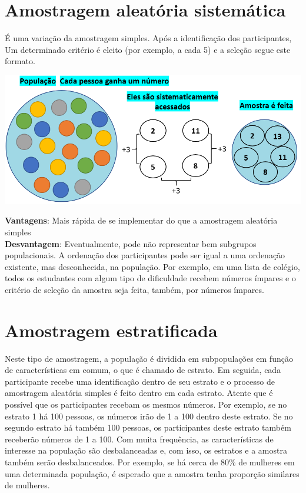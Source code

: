 \documentclass[
]{book}
\begin{document}
\hypertarget{amostragem-aleatuxf3ria-sistemuxe1tica}{%
\section{Amostragem aleatória
sistemática}\label{amostragem-aleatuxf3ria-sistemuxe1tica}}

É uma variação da amostragem simples. Após a identificação dos
participantes, Um determinado critério é eleito (por exemplo, a cada 5)
e a seleção segue este formato.

\includegraphics{./img/cap_a_sistematica.png}

\textbf{Vantagens}: Mais rápida de se implementar do que a amostragem
aleatória simples\\
\textbf{Desvantagem}: Eventualmente, pode não representar bem subgrupos
populacionais. A ordenação dos participantes pode ser igual a uma
ordenação existente, mas desconhecida, na população. Por exemplo, em uma
lista de colégio, todos os estudantes com algum tipo de dificuldade
recebem números ímpares e o critério de seleção da amostra seja feita,
também, por números ímpares.

\hypertarget{amostragem-estratificada}{%
\section{Amostragem estratificada}\label{amostragem-estratificada}}

Neste tipo de amostragem, a população é dividida em subpopulações em
função de características em comum, o que é chamado de estrato. Em
seguida, cada participante recebe uma identificação dentro de seu
estrato e o processo de amostragem aleatória simples é feito dentro em
cada estrato. Atente que é possível que os participantes recebam os
mesmos números. Por exemplo, se no estrato 1 há 100 pessoas, os números
irão de 1 a 100 dentro deste estrato. Se no segundo estrato há também
100 pessoas, os participantes deste estrato também receberão números de
1 a 100. Com muita frequência, as características de interesse na
população são desbalanceadas e, com isso, os estratos e a amostra também
serão desbalanceados. Por exemplo, se há cerca de 80\% de mulheres em
uma determinada população, é esperado que a amostra tenha proporção
similares de mulheres.
\end{document}
